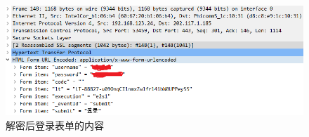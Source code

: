 \begin{figure}
	\centering
	\includegraphics[width=12cm]{image/SSHKEY-2}
	\caption{解密后登录表单的内容}
	\label{fig15}
\end{figure}
